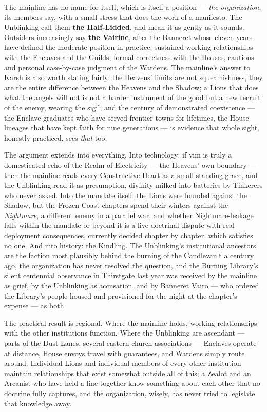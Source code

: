 The mainline has no name for itself, which is itself a position --- \textit{the organization}, its members say, with a small stress that does the work of a manifesto. The Unblinking call them \textbf{the Half-Lidded}, and mean it as gently as it sounds. Outsiders increasingly say \textbf{the Vairine}, after the Banneret whose eleven years have defined the moderate position in practice: sustained working relationships with the Enclaves and the Guilds, formal correctness with the Houses, cautious and personal case-by-case judgment of the Wardens. The mainline's answer to Karsh is also worth stating fairly: the Heavens' limits are not squeamishness, they are the entire difference between the Heavens and the Shadow; a Lions that does what the angels will not is not a harder instrument of the good but a new recruit of the enemy, wearing the sigil; and the century of demonstrated coexistence --- the Enclave graduates who have served frontier towns for lifetimes, the House lineages that have kept faith for nine generations --- is evidence that whole sight, honestly practiced, sees \textit{that} too.

The argument extends into everything. Into technology: if vim is truly a domesticated echo of the Realm of Electricity --- the Heavens' own boundary --- then the mainline reads every Constructive Heart as a small standing grace, and the Unblinking read it as presumption, divinity milked into batteries by Tinkerers who never asked. Into the mandate itself: the Lions were founded against the Shadow, but the Frozen Coast chapters spend their winters against the \textit{Nightmare}, a different enemy in a parallel war, and whether Nightmare-leakage falls within the mandate or beyond it is a live doctrinal dispute with real deployment consequences, currently decided chapter by chapter, which satisfies no one. And into history: the Kindling. The Unblinking's institutional ancestors are the faction most plausibly behind the burning of the Candlevault a century ago, the organization has never resolved the question, and the Burning Library's silent centennial observance in Thirstgate last year was received by the mainline as grief, by the Unblinking as accusation, and by Banneret Vairo --- who ordered the Library's people housed and provisioned for the night at the chapter's expense --- as both.

The practical result is regional. Where the mainline holds, working relationships with the other institutions function. Where the Unblinking are ascendant --- parts of the Dust Lanes, several eastern church associations --- Enclaves operate at distance, House envoys travel with guarantees, and Wardens simply route around. Individual Lions and individual members of every other institution maintain relationships that exist somewhat outside all of this; a Zealot and an Arcanist who have held a line together know something about each other that no doctrine fully captures, and the organization, wisely, has never tried to legislate that knowledge away.

